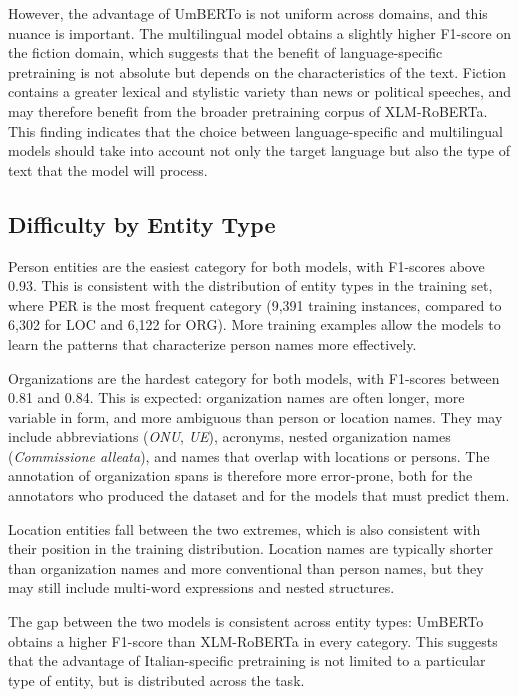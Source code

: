 However, the advantage of UmBERTo is not uniform across domains, and this nuance is important. The multilingual model obtains a slightly higher F1-score on the fiction domain, which suggests that the benefit of language-specific pretraining is not absolute but depends on the characteristics of the text. Fiction contains a greater lexical and stylistic variety than news or political speeches, and may therefore benefit from the broader pretraining corpus of XLM-RoBERTa. This finding indicates that the choice between language-specific and multilingual models should take into account not only the target language but also the type of text that the model will process.

\subsection{Difficulty by Entity Type}
\label{subsec:disc-entity}

Person entities are the easiest category for both models, with F1-scores above 0.93. This is consistent with the distribution of entity types in the training set, where PER is the most frequent category (9,391 training instances, compared to 6,302 for LOC and 6,122 for ORG). More training examples allow the models to learn the patterns that characterize person names more effectively.

Organizations are the hardest category for both models, with F1-scores between 0.81 and 0.84. This is expected: organization names are often longer, more variable in form, and more ambiguous than person or location names. They may include abbreviations (\textit{ONU}, \textit{UE}), acronyms, nested organization names (\textit{Commissione alleata}), and names that overlap with locations or persons. The annotation of organization spans is therefore more error-prone, both for the annotators who produced the dataset and for the models that must predict them.

Location entities fall between the two extremes, which is also consistent with their position in the training distribution. Location names are typically shorter than organization names and more conventional than person names, but they may still include multi-word expressions and nested structures.

The gap between the two models is consistent across entity types: UmBERTo obtains a higher F1-score than XLM-RoBERTa in every category. This suggests that the advantage of Italian-specific pretraining is not limited to a particular type of entity, but is distributed across the task.

